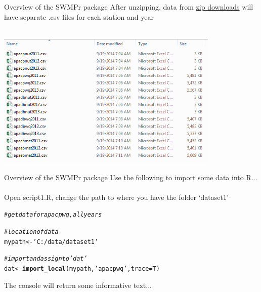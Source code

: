\documentclass[xcolor=svgnames]{beamer}\usepackage[]{graphicx}\usepackage[]{color}
\makeatletter
\newcommand{\hlstr}[1]{\textcolor[rgb]{0.192,0.494,0.8}{#1}}%
\newcommand{\hlcom}[1]{\textcolor[rgb]{0.678,0.584,0.686}{\textit{#1}}}%
\newcommand{\hlstd}[1]{\textcolor[rgb]{0.345,0.345,0.345}{#1}}%
\newcommand{\hlkwb}[1]{\textcolor[rgb]{0.69,0.353,0.396}{#1}}%
\newcommand{\hlkwc}[1]{\textcolor[rgb]{0.333,0.667,0.333}{#1}}%
\newcommand{\hlkwd}[1]{\textcolor[rgb]{0.737,0.353,0.396}{\textbf{#1}}}%
\newenvironment{kframe}{%
 \def\at@end@of@kframe{}%
 \ifinner\ifhmode%
  \def\at@end@of@kframe{\end{minipage}}%
  \begin{minipage}{\columnwidth}%
 \fi\fi%
 \def\FrameCommand##1{\hskip\@totalleftmargin \hskip-\fboxsep
 \colorbox{shadecolor}{##1}\hskip-\fboxsep
     \hskip-\linewidth \hskip-\@totalleftmargin \hskip\columnwidth}%
 \MakeFramed {\advance\hsize-\width
   \@totalleftmargin\z@ \linewidth\hsize
   \@setminipage}}%
 {\par\unskip\endMakeFramed%
 \at@end@of@kframe}
\newenvironment{knitrout}{}{} %
\makeatother
\begin{document}
\begin{frame}{Overview of the SWMPr package}
After unzipping, data from \href{http://cdmo.baruch.sc.edu/aqs/zips.cfm}{zip downloads} will have separate .csv files for each station and year\\~\\
\centerline{\includegraphics[width = 0.8\textwidth]{imgs/zips_ex.png}}
\end{frame}

\begin{frame}[fragile]{Overview of the SWMPr package}
Use the following to import some data into R... \\~\\
Open script1.R, change the path to where you have the folder `dataset1'
\begin{knitrout}\scriptsize
{}\color{fgcolor}\begin{kframe}
\begin{alltt}
\hlcom{# get data for apacpwq, all years}

\hlcom{# location of data}
\hlstd{mypath} \hlkwb{<-} \hlstr{'C:/data/dataset1'}

\hlcom{# import and assign to 'dat'}
\hlstd{dat} \hlkwb{<-} \hlkwd{import_local}\hlstd{(mypath,} \hlstr{'apacpwq'}\hlstd{,} \hlkwc{trace} \hlstd{= T)}
\end{alltt}
\end{kframe}
\end{knitrout}

The console will return some informative text...
\end{frame}
\end{document}
